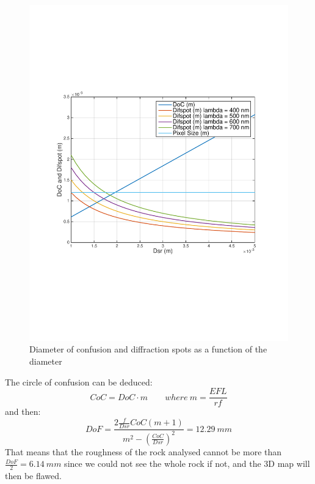\begin{figure}[H]
  \centering
  \includegraphics[trim=2cm 7cm 2cm 7cm, clip=true, totalheight=0.45\textheight, angle=0]{fig/DoCDifspot.pdf}
  \caption{Diameter of confusion and diffraction spots as a function of the diameter}
  \label{fig:DoCDifspot}
\end{figure}

The circle of confusion can be deduced:
\begin{equation*}
CoC = DoC \cdot m \qquad where \ m = \frac{EFL}{rf}
\end{equation*}
and then:
\begin{equation*}
DoF = \frac{2\frac{f}{Dsr}CoC(m+1)}{m^2 - (\frac{CoC}{Dsr})^2} = 12.29 \ mm
\end{equation*}
That means that the roughness of the rock analysed cannot be more than $\frac{DoF}{2} = 6.14 \ mm$ since we could not see the whole rock if not, and the 3D map will then be flawed.